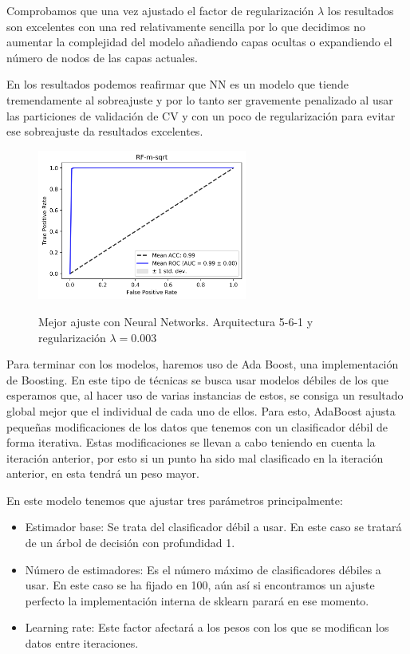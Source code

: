\documentclass{article}
\begin{document}
Comprobamos que una vez ajustado el factor de regularización $\lambda$ los resultados son excelentes con una red relativamente sencilla por lo que decidimos no aumentar la complejidad del modelo añadiendo capas ocultas o expandiendo el número de nodos de las capas actuales. 

En los resultados podemos reafirmar que NN es un modelo que tiende tremendamente al sobreajuste y por lo tanto ser gravemente penalizado al usar las particiones de validación de CV y con un poco de regularización para evitar ese sobreajuste da resultados excelentes.

\begin{figure}[H]
\centering
\includegraphics[width=260px]{figures/fig5}
\label{fig:figure}
\caption{Mejor ajuste con Neural Networks. Arquitectura 5-6-1 y regularización $\lambda=0.003$}
\end{figure}

\newpage

\noindent \textbf{\Large {}}

Para terminar con los modelos, haremos uso de Ada Boost, una implementación de Boosting. En este tipo de técnicas se busca usar modelos débiles de los que esperamos que, al hacer uso de varias instancias de estos, se consiga un resultado global mejor que el individual de cada uno de ellos.
Para esto, AdaBoost ajusta pequeñas modificaciones de los datos que tenemos con un clasificador débil de forma iterativa. Estas modificaciones se llevan a cabo teniendo en cuenta la iteración anterior, por esto si un punto ha sido mal clasificado en la iteración anterior, en esta tendrá un peso mayor.

En este modelo tenemos que ajustar tres parámetros principalmente:
\begin{itemize}
    \item Estimador base: Se trata del clasificador débil a usar. En este caso se tratará de un árbol de decisión con profundidad 1.
    \item Número de estimadores: Es el número máximo de clasificadores débiles a usar. En este caso se ha fijado en 100, aún así si encontramos un ajuste perfecto la implementación interna de sklearn parará en ese momento.
    \item Learning rate: Este factor afectará a los pesos con los que se modifican los datos entre iteraciones.
\end{itemize}
\end{document}
